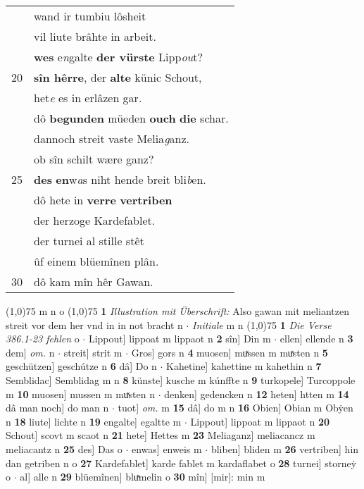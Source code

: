 \documentclass[8pt,a4paper,notitlepage]{article}
\begin{document}
\begin{table}[ht]
\begin{minipage}[t]{0.5\linewidth}
\begin{tabular}{rl}
 & wand ir tumbiu lôsheit\\ 
 & vil liute brâhte in arbeit.\\ 
 & \textbf{wes} e\textit{n}galte \textbf{der vürste} Lipp\textit{ou}t?\\ 
20 & \textbf{sîn hêrre}, der \textbf{alte} künic Schout,\\ 
 & het\textit{e} es in erlâzen gar.\\ 
 & dô \textbf{begunden} müeden \textbf{ouch} \textbf{die} schar.\\ 
 & dannoch streit vaste Melia\textit{g}anz.\\ 
 & ob sîn schilt wære ganz?\\ 
25 & \textbf{des} \textbf{en}w\textit{a}s niht hende breit bli\textit{b}en.\\ 
 & dô hete in \textbf{verre} \textbf{vertriben}\\ 
 & der herzoge Kardefablet.\\ 
 & der turnei al stille stêt\\ 
 & ûf einem blüemînen plân.\\ 
30 & dô kam mîn hêr Gawan.\\ 
\end{tabular}
\scriptsize
\line(1,0){75} \newline
m n o \newline
\line(1,0){75} \newline
\textbf{1} \textit{Illustration mit Überschrift:} Also gawan mit meliantzen streit vor dem her vnd in in not bracht n   $\cdot$ \textit{Initiale} m n  \newline
\line(1,0){75} \newline
\textbf{1} \textit{Die Verse 386.1-23 fehlen} o   $\cdot$ Lippout] lippoat m lippaot n \textbf{2} sîn] Din m  $\cdot$ ellen] ellende n \textbf{3} dem] \textit{om.} n  $\cdot$ streit] strit m  $\cdot$ Gros] gors n \textbf{4} muosen] muͯssen m muͯsten n \textbf{5} geschützen] geschútze n \textbf{6} dâ] Do n  $\cdot$ Kahetine] kahettine m kahethin n \textbf{7} Semblidac] Semblidag m n \textbf{8} künste] kusche m kúnffte n \textbf{9} turkopele] Turcoppole m \textbf{10} muosen] mussen m muͯsten n  $\cdot$ denken] gedencken n \textbf{12} heten] htten m \textbf{14} dâ man noch] do man n  $\cdot$ tuot] \textit{om.} m \textbf{15} dâ] do m n \textbf{16} Obien] Obian m Obẏen n \textbf{18} liute] lichte n \textbf{19} engalte] egaltte m  $\cdot$ Lippout] lippoat m lippaot n \textbf{20} Schout] scovt m scaot n \textbf{21} hete] Hettes m \textbf{23} Meliaganz] meliacancz m meliacantz n \textbf{25} des] Das o  $\cdot$ enwas] enweis m  $\cdot$ bliben] bliden m \textbf{26} vertriben] hin dan getriben n o \textbf{27} Kardefablet] karde fablet m kardaflabet o \textbf{28} turnei] storneẏ o  $\cdot$ al] alle n \textbf{29} blüemînen] bluͯmelin o \textbf{30} mîn] [mir]: min m \newline
\end{minipage}
\end{table}
\end{document}
